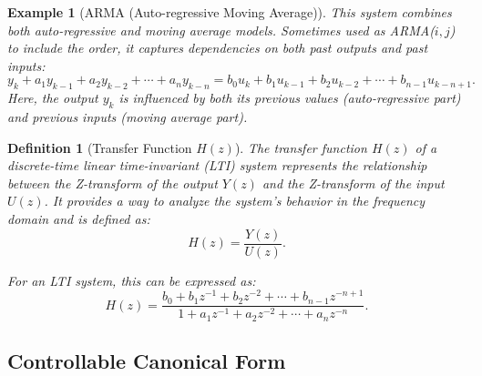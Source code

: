 \documentclass[a4 paper]{article}
\numberwithin{equation}{section}
\theoremstyle{boldStyle}
\theoremstyle{boldBlueStyle}
\theoremstyle{boldPurpleStyle}
\theoremstyle{boldRedStyle}
\newtheorem{definition}{Definition}[section]
\theoremstyle{boldGreenStyle}
\newtheorem{example}{Example}[section]
\begin{document}
\begin{example}[ARMA (Auto-regressive Moving Average)]
  This system combines both auto-regressive and moving average models. 
  Sometimes used as ARMA(\(i,j\)) to include the order, it captures dependencies on both past outputs and past inputs:
  \[
  y_k + a_1 y_{k-1} + a_2 y_{k-2} + \cdots + a_n y_{k-n} = b_0 u_k + b_1 u_{k-1} + b_2 u_{k-2} + \cdots + b_{n-1} u_{k-n+1}.
  \]
  Here, the output \( y_k \) is influenced by both its previous values (auto-regressive part) and previous inputs (moving average part).
\end{example}


\begin{definition}[Transfer Function \( H(z) \)]
  The transfer function \( H(z) \) of a discrete-time linear time-invariant (LTI) system represents the relationship between the Z-transform of the output \( Y(z) \) and the Z-transform of the input \( U(z) \). It provides a way to analyze the system's behavior in the frequency domain and is defined as:
  \[
  H(z) = \frac{Y(z)}{U(z)}.
  \]

  For an LTI system, this can be expressed as:
  \[
  H(z) = \frac{b_0 + b_1 z^{-1} + b_2 z^{-2} + \cdots + b_{n-1} z^{-n+1}}{1 + a_1 z^{-1} + a_2 z^{-2} + \cdots + a_n z^{-n}}.
  \]
\end{definition}


\subsection{Controllable Canonical Form}
\end{document}
